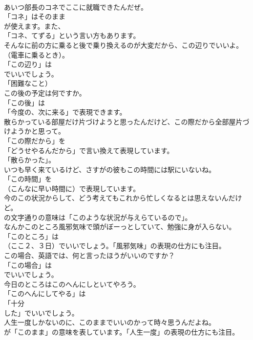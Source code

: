 \documentclass[8pt]{extreport}
\begin{document}
\begin{CJK}{UTF8}{min}
\\	あいつ部長のコネでここに就職できたんだぜ。 
\\	「コネ」はそのまま
\\	が使えます。また、
\\	「コネ、てずる」という言い方もあります。	
\\	そんなに前の方に乗ると後で乗り換えるのが大変だから、この辺りでいいよ。（電車に乗るとき）。 
\\	「この辺り」は
\\	でいいでしょう。
\\	「困難なこと）	
\\	この後の予定は何ですか。 
\\	「この後」は
\\	「今度の、次に来る」で表現できます。	
\\	散らかっている部屋だけ片づけようと思ったんだけど、この際だから全部屋片づけようかと思って。 
\\	「この際だから」を
\\	「どうせやるんだから」で言い換えて表現しています。
\\	「散らかった」。	
\\	いつも早く来ているけど、さすがの彼もこの時間には駅にいないね。 
\\	「この時間」を 
\\	（こんなに早い時間に）で表現しています。	
\\	今のこの状況からして、どう考えてもこれから忙しくなるとは思えないんだけど。 
\\	の文字通りの意味は「このような状況が与えらているので」。	
\\	なんかこのところ風邪気味で頭がぼーっとしていて、勉強に身が入らない。 
\\	「このところ」は 
\\	（ここ２、３日）でいいでしょう。「風邪気味」の表現の仕方にも注目。	
\\	この場合、英語では、何と言ったほうがいいのですか？ 
\\	「この場合」は
\\	でいいでしょう。	
\\	今日のところはこのへんにしといてやろう。 
\\	「このへんにしてやる」は
\\	「十分 
\\	した」でいいでしょう。	
\\	人生一度しかないのに、このままでいいのかって時々思うんだよね。 
\\	が「このまま」の意味を表しています。「人生一度」の表現の仕方にも注目。	

\end{CJK}
\end{document}
